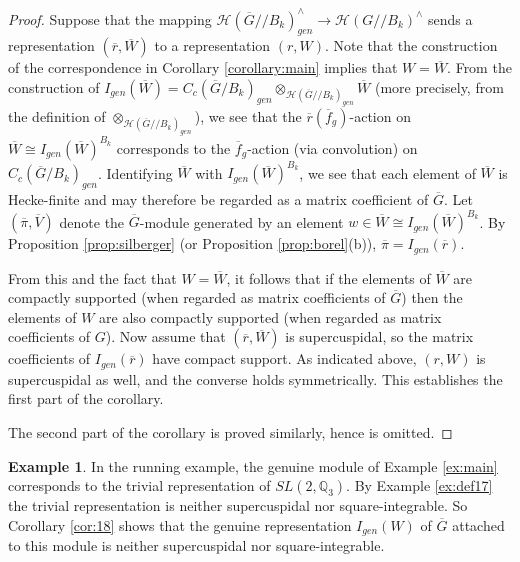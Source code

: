 \documentclass[12pt,letterpaper,reqno]{amsart}
\let\cal\mathcal
\theoremstyle{definition}
\newtheorem{example}[theorem]{Example}
\theoremstyle{remark}
\numberwithin{equation}{section}
\begin{document}
\begin{proof}
Suppose that the mapping
${\cal H}(\overline{G}//B_k)_{gen}^\wedge \rightarrow {\cal H}(G//B_k)^\wedge$
sends a representation $(\overline{r},\overline{W})$ to a representation
$(r,W)$. Note that the construction of the correspondence in Corollary
\ref{corollary:main} implies that $W=\overline{W}$. From the construction of
$I_{gen}(\overline{W})= C_c(\overline{G}/B_k)_{gen}
\otimes_{{\cal H}(\overline{G}//B_k)_{gen}}\overline{W}$ (more precisely, from
the definition of $\otimes_{{\cal H}(\overline{G}//B_k)_{gen}}$), we see that
the $\overline{r}(\overline{f}_g)$-action on
$\overline{W}\cong I_{gen}(\overline{W})^{B_k}$ corresponds to the
$\overline{f}_g$-action (via convolution) on $C_c(\overline{G}/B_k)_{gen}$.
Identifying $\overline{W}$ with $I_{gen}(\overline{W})^{B_k}$, we see that
each element of $\overline{W}$ is Hecke-finite and may therefore be regarded
as a matrix coefficient of $\overline{G}$. Let $(\overline{\pi},\overline{V})$
denote the $\overline{G}$-module generated by an element
$w\in \overline{W}\cong I_{gen}(\overline{W})^{B_k}$. By Proposition
\ref{prop:silberger} (or Proposition \ref{prop:borel}(b)),
$\overline{\pi}=I_{gen}(\overline{r})$.

From this and the fact that $W=\overline{W}$, it follows that if the elements
of $\overline{W}$ are compactly supported (when regarded as matrix
coefficients of $\overline{G}$) then the elements of $W$ are also compactly
supported (when regarded as matrix coefficients of $G$). Now assume that
$(\overline{r},\overline{W})$ is supercuspidal, so the matrix coefficients of
$I_{gen}(\overline{r})$ have compact support. As indicated above, $(r,W)$ is
supercuspidal as well, and the converse holds symmetrically. This establishes
the first part of the corollary.

The second part of the corollary is proved similarly, hence is omitted.
\end{proof}

\begin{example}
\label{ex:cor18}
In the running example, the genuine module of Example \ref{ex:main}
corresponds to the trivial representation of $SL(2,\mathbb{Q}_3)$. By Example
\ref{ex:def17} the trivial representation is neither supercuspidal nor
square-integrable. So Corollary \ref{cor:18} shows that the genuine
representation $I_{gen}(W)$ of $\overline{G}$ attached to this module is
neither supercuspidal nor square-integrable.
\end{example}
\end{document}
